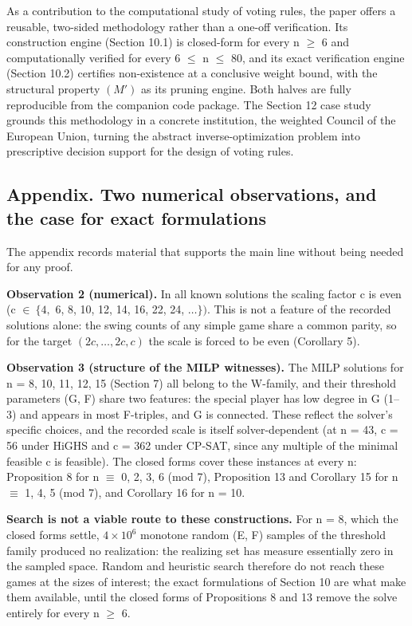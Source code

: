 \documentclass[
]{article}
\begin{document}
As a contribution to the computational study of voting rules, the paper
offers a reusable, two-sided methodology rather than a one-off
verification. Its construction engine (Section 10.1) is closed-form for
every n \(\ge\) 6 and computationally verified for every 6 \(\le\) n
\(\le\) 80, and its exact verification engine (Section 10.2) certifies
non-existence at a conclusive weight bound, with the structural property
\((M')\) as its pruning engine. Both halves are fully reproducible from
the companion code package. The Section 12 case study grounds this
methodology in a concrete institution, the weighted Council of the
European Union, turning the abstract inverse-optimization problem into
prescriptive decision support for the design of voting rules.

\subsection{Appendix. Two numerical observations, and the case for exact
formulations}\label{appendix.-two-numerical-observations-and-the-case-for-exact-formulations}

The appendix records material that supports the main line without being
needed for any proof.

\textbf{Observation 2 (numerical).} In all known solutions the scaling
factor c is even (c \(\in\ \{4,\) 6, 8, 10, 12, 14, 16, 22, 24,
\(\dots\}).\) This is not a feature of the recorded solutions alone: the
swing counts of any simple game share a common parity, so for the target
\((2c,\dots,2c,c)\) the scale is forced to be even (Corollary 5).

\textbf{Observation 3 (structure of the MILP witnesses).} The MILP
solutions for n = 8, 10, 11, 12, 15 (Section 7) all belong to the
W-family, and their threshold parameters (G, F) share two features: the
special player has low degree in G (1--3) and appears in most F-triples,
and G is connected. These reflect the solver's specific choices, and the
recorded scale is itself solver-dependent (at n = 43, c = 56 under HiGHS
and c = 362 under CP-SAT, since any multiple of the minimal feasible c
is feasible). The closed forms cover these instances at every n:
Proposition 8 for n \(\equiv\) 0, 2, 3, 6 (mod 7), Proposition 13 and
Corollary 15 for n \(\equiv\) 1, 4, 5 (mod 7), and Corollary 16 for n =
10.

\textbf{Search is not a viable route to these constructions.} For n = 8,
which the closed forms settle, \(4\times10^6\) monotone random (E, F)
samples of the threshold family produced no realization: the realizing
set has measure essentially zero in the sampled space. Random and
heuristic search therefore do not reach these games at the sizes of
interest; the exact formulations of Section 10 are what make them
available, until the closed forms of Propositions 8 and 13 remove the
solve entirely for every n \(\ge\) 6.
\end{document}
